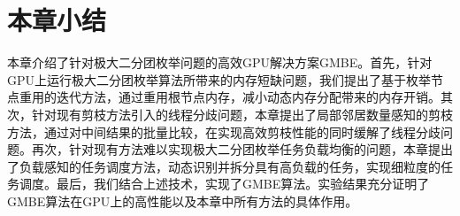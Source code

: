 \section{本章小结}

本章介绍了针对极大二分团枚举问题的高效GPU解决方案GMBE。首先，针对GPU上运行极大二分团枚举算法所带来的内存短缺问题，我们提出了基于枚举节点重用的迭代方法，通过重用根节点内存，减小动态内存分配带来的内存开销。其次，针对现有剪枝方法引入的线程分歧问题，本章提出了局部邻居数量感知的剪枝方法，通过对中间结果的批量比较，在实现高效剪枝性能的同时缓解了线程分歧问题。再次，针对现有方法难以实现极大二分团枚举任务负载均衡的问题，本章提出了负载感知的任务调度方法，动态识别并拆分具有高负载的任务，实现细粒度的任务调度。最后，我们结合上述技术，实现了GMBE算法。实验结果充分证明了GMBE算法在GPU上的高性能以及本章中所有方法的具体作用。